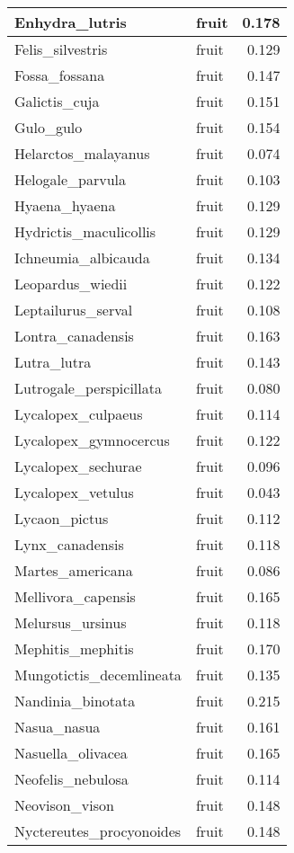 \begin{table}
\begin{tabular}[t]{l|l|r}
\hline
Enhydra\_lutris & fruit & 0.178\\
\hline
Felis\_silvestris & fruit & 0.129\\
\hline
Fossa\_fossana & fruit & 0.147\\
\hline
Galictis\_cuja & fruit & 0.151\\
\hline
Gulo\_gulo & fruit & 0.154\\
\hline
Helarctos\_malayanus & fruit & 0.074\\
\hline
Helogale\_parvula & fruit & 0.103\\
\hline
Hyaena\_hyaena & fruit & 0.129\\
\hline
Hydrictis\_maculicollis & fruit & 0.129\\
\hline
Ichneumia\_albicauda & fruit & 0.134\\
\hline
Leopardus\_wiedii & fruit & 0.122\\
\hline
Leptailurus\_serval & fruit & 0.108\\
\hline
Lontra\_canadensis & fruit & 0.163\\
\hline
Lutra\_lutra & fruit & 0.143\\
\hline
Lutrogale\_perspicillata & fruit & 0.080\\
\hline
Lycalopex\_culpaeus & fruit & 0.114\\
\hline
Lycalopex\_gymnocercus & fruit & 0.122\\
\hline
Lycalopex\_sechurae & fruit & 0.096\\
\hline
Lycalopex\_vetulus & fruit & 0.043\\
\hline
Lycaon\_pictus & fruit & 0.112\\
\hline
Lynx\_canadensis & fruit & 0.118\\
\hline
Martes\_americana & fruit & 0.086\\
\hline
Mellivora\_capensis & fruit & 0.165\\
\hline
Melursus\_ursinus & fruit & 0.118\\
\hline
Mephitis\_mephitis & fruit & 0.170\\
\hline
Mungotictis\_decemlineata & fruit & 0.135\\
\hline
Nandinia\_binotata & fruit & 0.215\\
\hline
Nasua\_nasua & fruit & 0.161\\
\hline
Nasuella\_olivacea & fruit & 0.165\\
\hline
Neofelis\_nebulosa & fruit & 0.114\\
\hline
Neovison\_vison & fruit & 0.148\\
\hline
Nyctereutes\_procyonoides & fruit & 0.148\\

\end{tabular}
\end{table}

